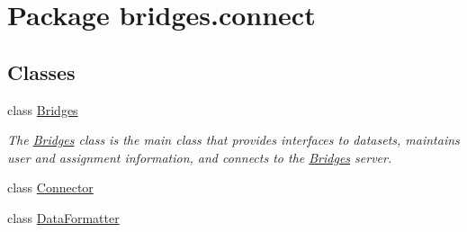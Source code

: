 \hypertarget{namespacebridges_1_1connect}{}\section{Package bridges.\+connect}
\label{namespacebridges_1_1connect}
\subsection*{Classes}
\begin{DoxyCompactItemize}
\item 
class \mbox{\hyperlink{classbridges_1_1connect_1_1_bridges}{Bridges}}
\begin{DoxyCompactList}\small\item\em The \mbox{\hyperlink{classbridges_1_1connect_1_1_bridges}{Bridges}} class is the main class that provides interfaces to datasets, maintains user and assignment information, and connects to the \mbox{\hyperlink{classbridges_1_1connect_1_1_bridges}{Bridges}} server. \end{DoxyCompactList}\item 
class \mbox{\hyperlink{classbridges_1_1connect_1_1_connector}{Connector}}
\item 
class \mbox{\hyperlink{classbridges_1_1connect_1_1_data_formatter}{Data\+Formatter}}
\end{DoxyCompactItemize}
